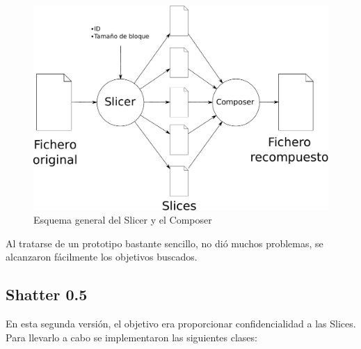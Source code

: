 \begin{figure}[ht]
  \centering
  \includegraphics[scale=0.5]{Figures/Assembler}
  \decoRule
  \caption[Slicer - Composer]{Esquema general del Slicer y el Composer}
  \label{fig:Assembler}
\end{figure}

Al tratarse de un prototipo bastante sencillo, no dió muchos problemas, se
alcanzaron fácilmente los objetivos buscados.

\subsection{Shatter 0.5}

En esta segunda versión, el objetivo era proporcionar confidencialidad a las
Slices. Para llevarlo a cabo se implementaron las siguientes clases:

